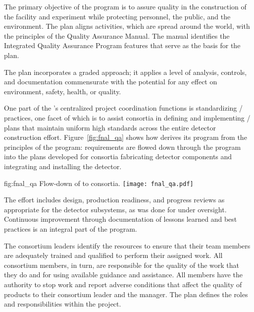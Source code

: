 The primary objective of the   program is
to assure quality in the construction of the  facility and
 experiment while protecting
 personnel, the public, and the environment. The
 plan aligns   activities, which
are spread around the world, with the principles of the \fnal Quality
Assurance Manual. The manual identifies the \fnal Integrated Quality
Assurance Program features that serve as the basis for the
  plan.

The   plan incorporates 
a graded approach; it applies a level of analysis,
controls, and documentation commensurate with the potential for any effect on
environment, safety, health, or quality.

One part of the 's centralized project
coordination functions is
standardizing / practices, one facet
of which is to assist consortia in defining and implementing
/ plans that maintain uniform high
standards across the entire detector construction
effort. Figure~\ref{fig:fnal_qa} shows how  
derives its  program from the principles of the \fnal {} program:
requirements are flowed down through the 
 program into the  plans developed for consortia fabricating detector components and integrating and installing the detector.

\begin{dunefigure}[\fnal QA]{fig:fnal_qa}
  {Flow-down of \fnal {} to consortia.}
  \texttt{[image: fnal\_qa.pdf]}
\end{dunefigure}

The  effort includes design, production readiness, and
progress reviews as appropriate for the  detector
subsystems, as was done for  under 
oversight. Continuous improvement through documentation of lessons learned and best practices is
an integral part of the program. 


The  consortium leaders identify the
resources to ensure that their team members are adequately trained and
qualified to perform their assigned work. 
All consortium members, in turn, are responsible for the quality of the work that
they do and for using available guidance and assistance. All members 
have the authority to stop work and report adverse conditions that
affect the quality of  products to their 
 consortium leader and the 
 manager. The  plan
defines the  roles and responsibilities within the 
project.



